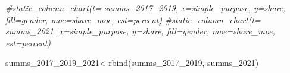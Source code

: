 \documentclass[
  12pt,
]{article}
\newenvironment{Shaded}{\begin{snugshade}}{\end{snugshade}}
\newcommand{\CommentTok}[1]{\textcolor[rgb]{0.56,0.35,0.01}{\textit{#1}}}
\newcommand{\FunctionTok}[1]{\textcolor[rgb]{0.00,0.00,0.00}{#1}}
\newcommand{\NormalTok}[1]{#1}
\newcommand{\OtherTok}[1]{\textcolor[rgb]{0.56,0.35,0.01}{#1}}
\begin{document}
\begin{Shaded}
\begin{Highlighting}[]
 

\CommentTok{\#static\_column\_chart(t= summs\_2017\_2019, x=\textquotesingle{}simple\_purpose\textquotesingle{}, y=\textquotesingle{}share\textquotesingle{},  fill=\textquotesingle{}gender\textquotesingle{}, moe=\textquotesingle{}share\_moe\textquotesingle{}, est=\textquotesingle{}percent\textquotesingle{})}
\CommentTok{\#static\_column\_chart(t= summs\_2021, x=\textquotesingle{}simple\_purpose\textquotesingle{}, y=\textquotesingle{}share\textquotesingle{},  fill=\textquotesingle{}gender\textquotesingle{}, moe=\textquotesingle{}share\_moe\textquotesingle{}, est=\textquotesingle{}percent\textquotesingle{})}

  
\NormalTok{summs\_2017\_2019\_2021}\OtherTok{\textless{}{-}}\FunctionTok{rbind}\NormalTok{(summs\_2017\_2019, summs\_2021)}
\end{Highlighting}
\end{Shaded}
\end{document}
